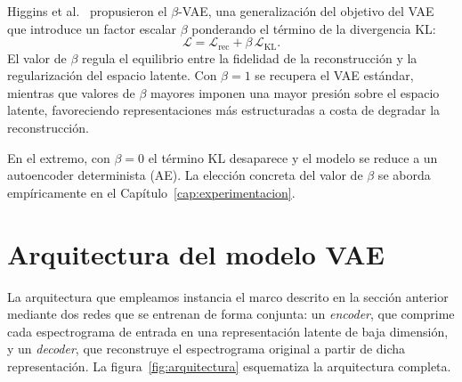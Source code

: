 \documentclass[12pt,a4paper,twoside]{tesis}
\begin{document}
Higgins et al.~\cite{higgins2017beta} propusieron el $\beta$-VAE, una generalización del objetivo del VAE que introduce un factor escalar $\beta$ ponderando el término de la divergencia KL:
\begin{equation}
\mathcal{L} = \mathcal{L}_{\mathrm{rec}} + \beta \, \mathcal{L}_{\mathrm{KL}}.
\end{equation}
El valor de $\beta$ regula el equilibrio entre la fidelidad de la reconstrucción y la regularización del espacio latente. Con $\beta = 1$ se recupera el VAE estándar, mientras que valores de $\beta$ mayores imponen una mayor presión sobre el espacio latente, favoreciendo representaciones más estructuradas a costa de degradar la reconstrucción.

En el extremo, con $\beta = 0$ el término KL desaparece y el modelo se reduce a un autoencoder determinista (AE). La elección concreta del valor de $\beta$ se aborda empíricamente en el Capítulo~\ref{cap:experimentacion}.

\newpage
\section{Arquitectura del modelo VAE}

La arquitectura que empleamos instancia el marco descrito en la sección anterior mediante dos redes que se entrenan de forma conjunta: un \textit{encoder}, que comprime cada espectrograma de entrada en una representación latente de baja dimensión, y un \textit{decoder}, que reconstruye el espectrograma original a partir de dicha representación. La figura~\ref{fig:arquitectura} esquematiza la arquitectura completa.
\end{document}
